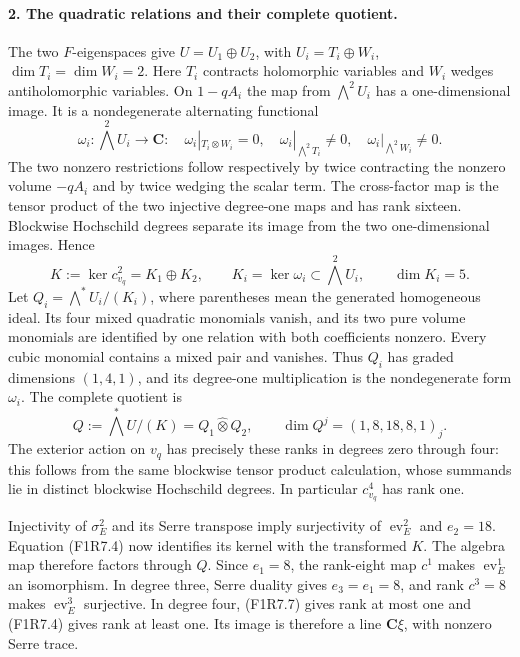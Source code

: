 \paragraph{2. The quadratic relations and their complete quotient.}
The two $F$-eigenspaces give $U=U_1\oplus U_2$, with
$U_i=T_i\oplus W_i$, $\dim T_i=\dim W_i=2$. Here $T_i$ contracts
holomorphic variables and $W_i$ wedges antiholomorphic variables.
On $1-qA_i$ the map from $\bigwedge^2U_i$ has a one-dimensional
image. It is a nondegenerate alternating functional
\[
 \omega_i:\bigwedge^2U_i\longrightarrow\mathbf C:
 \quad\omega_i|_{T_i\otimes W_i}=0,
 \quad\omega_i|_{\bigwedge^2T_i}\ne0,
 \quad\omega_i|_{\bigwedge^2W_i}\ne0.
\]
The two nonzero restrictions follow respectively by twice contracting
the nonzero volume $-qA_i$ and by twice wedging the scalar term.
The cross-factor map is the tensor product of the two injective
degree-one maps and has rank sixteen. Blockwise Hochschild degrees
separate its image from the two one-dimensional images. Hence
\[
 K:=\ker c_{v_q}^2=K_1\oplus K_2,\qquad
 K_i=\ker\omega_i\subset\bigwedge^2U_i,
 \qquad \dim K_i=5.
 \tag{F1R7.6}
\]
Let $Q_i=\bigwedge^*U_i/(K_i)$, where parentheses mean the generated
homogeneous ideal. Its four mixed quadratic monomials vanish, and
its two pure volume monomials are identified by one relation with
both coefficients nonzero. Every cubic monomial contains a mixed
pair and vanishes. Thus $Q_i$ has graded dimensions $(1,4,1)$,
and its degree-one multiplication is the nondegenerate form
$\omega_i$. The complete quotient is
\[
 Q:=\bigwedge^*U/(K)=Q_1\mathbin{\widehat\otimes}Q_2,
 \qquad \dim Q^j=(1,8,18,8,1)_j.
 \tag{F1R7.7}
\]
The exterior action on $v_q$ has precisely these ranks in degrees
zero through four: this follows from the same blockwise tensor
product calculation, whose summands lie in distinct blockwise
Hochschild degrees. In particular $c^4_{v_q}$ has rank one.

Injectivity of $\sigma_E^2$ and its Serre transpose imply surjectivity
of $\operatorname{ev}_E^2$ and $e_2=18$. Equation (F1R7.4) now
identifies its kernel with the transformed $K$. The algebra map
therefore factors through $Q$. Since $e_1=8$, the rank-eight map
$c^1$ makes $\operatorname{ev}_E^1$ an isomorphism. In degree three,
Serre duality gives $e_3=e_1=8$, and rank $c^3=8$ makes
$\operatorname{ev}_E^3$ surjective. In degree four, (F1R7.7) gives
rank at most one and (F1R7.4) gives rank at least one. Its image is
therefore a line $\mathbf C\xi$, with nonzero Serre trace.

